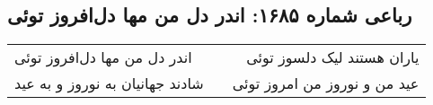 \begin{center}
\section*{رباعی شماره ۱۶۸۵: اندر دل من مها دل‌افروز توئی}
\label{sec:1685}
\begin{longtable}{l p{0.5cm} r}
اندر دل من مها دل‌افروز توئی
&&
یاران هستند لیک دلسوز توئی
\\
شادند جهانیان به نوروز و به عید
&&
عید من و نوروز من امروز توئی
\\
\end{longtable}
\end{center}
